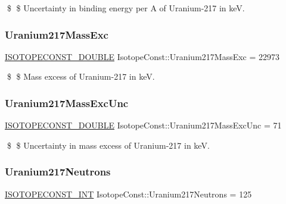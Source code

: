 \$ \$ Uncertainty in binding energy per A of Uranium-\/217 in keV. \mbox{\label{group___isotope_const-_uranium-_u217_ga376e9d27c83550a09374385da910eacb}} 
\subsubsection{\texorpdfstring{Uranium217\+Mass\+Exc}{Uranium217MassExc}}
{\footnotesize\ttfamily \mbox{\hyperlink{group___isotope_const-_macros_ga8f45a7272ce02c0b4c65c44636ed719a}{I\+S\+O\+T\+O\+P\+E\+C\+O\+N\+S\+T\+\_\+\+D\+O\+U\+B\+LE}} Isotope\+Const\+::\+Uranium217\+Mass\+Exc = 22973}

\$ \$ Mass excess of Uranium-\/217 in keV. \mbox{\label{group___isotope_const-_uranium-_u217_ga586bc2ef240867162a1b24a0f30af56c}} 
\subsubsection{\texorpdfstring{Uranium217\+Mass\+Exc\+Unc}{Uranium217MassExcUnc}}
{\footnotesize\ttfamily \mbox{\hyperlink{group___isotope_const-_macros_ga8f45a7272ce02c0b4c65c44636ed719a}{I\+S\+O\+T\+O\+P\+E\+C\+O\+N\+S\+T\+\_\+\+D\+O\+U\+B\+LE}} Isotope\+Const\+::\+Uranium217\+Mass\+Exc\+Unc = 71}

\$ \$ Uncertainty in mass excess of Uranium-\/217 in keV. \mbox{\label{group___isotope_const-_uranium-_u217_ga0498aa7aa1b60de16499735a9bb3b34e}} 
\subsubsection{\texorpdfstring{Uranium217\+Neutrons}{Uranium217Neutrons}}
{\footnotesize\ttfamily \mbox{\hyperlink{group___isotope_const-_macros_ga5f18360b3e99483a35c32d789e62621c}{I\+S\+O\+T\+O\+P\+E\+C\+O\+N\+S\+T\+\_\+\+I\+NT}} Isotope\+Const\+::\+Uranium217\+Neutrons = 125}

